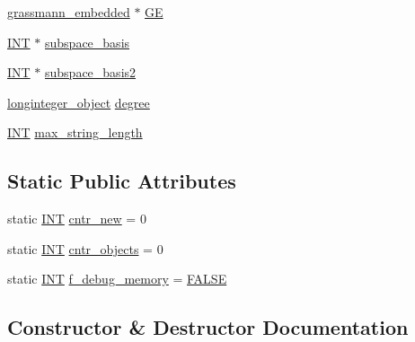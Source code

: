 \begin{DoxyCompactItemize}
\item 
\mbox{\hyperlink{classgrassmann__embedded}{grassmann\+\_\+embedded}} $\ast$ \mbox{\hyperlink{classaction__on__grassmannian_ad6c03bb09128e9c1b41406383cd0fca5}{GE}}
\item 
\mbox{\hyperlink{galois_8h_a09fddde158a3a20bd2dcadb609de11dc}{I\+NT}} $\ast$ \mbox{\hyperlink{classaction__on__grassmannian_a40af5e069becb4b43e7cb7acdc5279cd}{subspace\+\_\+basis}}
\item 
\mbox{\hyperlink{galois_8h_a09fddde158a3a20bd2dcadb609de11dc}{I\+NT}} $\ast$ \mbox{\hyperlink{classaction__on__grassmannian_a09fb6ca649c7bd76e129b31d998a2cfb}{subspace\+\_\+basis2}}
\item 
\mbox{\hyperlink{classlonginteger__object}{longinteger\+\_\+object}} \mbox{\hyperlink{classaction__on__grassmannian_a416cecfb50a8beaac36b25288b341394}{degree}}
\item 
\mbox{\hyperlink{galois_8h_a09fddde158a3a20bd2dcadb609de11dc}{I\+NT}} \mbox{\hyperlink{classaction__on__grassmannian_ad564d355a7055b51c1c14bf248233698}{max\+\_\+string\+\_\+length}}
\end{DoxyCompactItemize}
\subsection*{Static Public Attributes}
\begin{DoxyCompactItemize}
\item 
static \mbox{\hyperlink{galois_8h_a09fddde158a3a20bd2dcadb609de11dc}{I\+NT}} \mbox{\hyperlink{classaction__on__grassmannian_ab195058a6afd827d636d75e37f06f3ee}{cntr\+\_\+new}} = 0
\item 
static \mbox{\hyperlink{galois_8h_a09fddde158a3a20bd2dcadb609de11dc}{I\+NT}} \mbox{\hyperlink{classaction__on__grassmannian_a06338e035f463a15f516e116f1afe648}{cntr\+\_\+objects}} = 0
\item 
static \mbox{\hyperlink{galois_8h_a09fddde158a3a20bd2dcadb609de11dc}{I\+NT}} \mbox{\hyperlink{classaction__on__grassmannian_a7b5fccb89d3ef923d0df05029ba3dc00}{f\+\_\+debug\+\_\+memory}} = \mbox{\hyperlink{nauty_8h_aa93f0eb578d23995850d61f7d61c55c1}{F\+A\+L\+SE}}
\end{DoxyCompactItemize}


\subsection{Constructor \& Destructor Documentation}
\mbox{\label{classaction__on__grassmannian_aa07d895e323ef89b55205708b99f7662}} 

